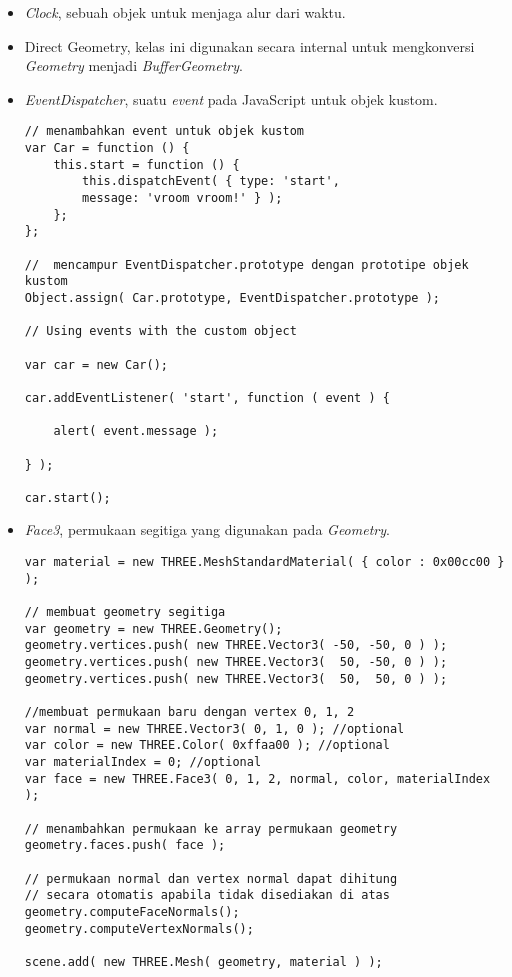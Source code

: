 \begin{itemize}
\begin{itemize}
	\item{\it Clock}, sebuah objek untuk menjaga alur dari waktu.
	\item{Direct Geometry}, kelas ini digunakan secara internal untuk mengkonversi {\it Geometry} menjadi {\it BufferGeometry}.
	\item{\it EventDispatcher}, suatu {\it event} pada JavaScript untuk objek kustom.
\begin{lstlisting}
// menambahkan event untuk objek kustom
var Car = function () {
    this.start = function () {
        this.dispatchEvent( { type: 'start',
        message: 'vroom vroom!' } );
    };
};

//  mencampur EventDispatcher.prototype dengan prototipe objek kustom
Object.assign( Car.prototype, EventDispatcher.prototype );

// Using events with the custom object

var car = new Car();

car.addEventListener( 'start', function ( event ) {

    alert( event.message );

} );

car.start();
\end{lstlisting}

	\item{\it Face3}, permukaan segitiga yang digunakan pada {\it Geometry}.
\begin{lstlisting}
var material = new THREE.MeshStandardMaterial( { color : 0x00cc00 } );

// membuat geometry segitiga
var geometry = new THREE.Geometry();
geometry.vertices.push( new THREE.Vector3( -50, -50, 0 ) );
geometry.vertices.push( new THREE.Vector3(  50, -50, 0 ) );
geometry.vertices.push( new THREE.Vector3(  50,  50, 0 ) );

//membuat permukaan baru dengan vertex 0, 1, 2
var normal = new THREE.Vector3( 0, 1, 0 ); //optional
var color = new THREE.Color( 0xffaa00 ); //optional
var materialIndex = 0; //optional
var face = new THREE.Face3( 0, 1, 2, normal, color, materialIndex );

// menambahkan permukaan ke array permukaan geometry
geometry.faces.push( face );

// permukaan normal dan vertex normal dapat dihitung
// secara otomatis apabila tidak disediakan di atas
geometry.computeFaceNormals();
geometry.computeVertexNormals();

scene.add( new THREE.Mesh( geometry, material ) );
\end{lstlisting}


\end{itemize}
\end{itemize}
